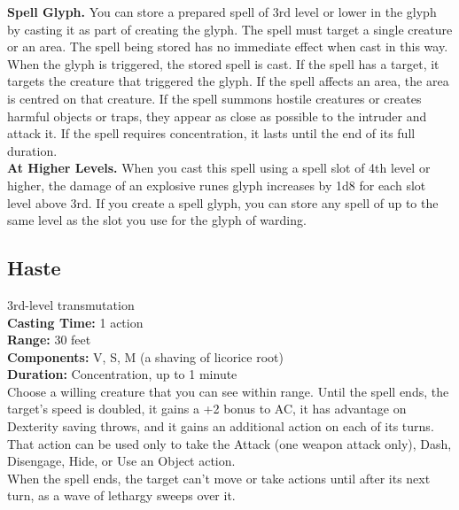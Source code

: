 \documentclass[11pt, A4paper, english]{article}
\begin{document}
\textbf{Spell Glyph.} You can store a prepared spell of 3rd level or lower in the glyph by casting it as part of creating the glyph. The spell must target a single creature or an area. The spell being stored has no immediate effect when cast in this way. When the glyph is triggered, the stored spell is cast. If the spell has a target, it targets the creature that triggered the glyph. If the spell affects an area, the area is centred on that creature. If the spell summons hostile creatures or creates harmful objects or traps, they appear as close as possible to the intruder and attack it. If the spell requires concentration, it lasts until the end of its full duration. \\
\textbf{At Higher Levels.} When you cast this spell using a spell slot of 4th level or higher, the damage of an explosive runes glyph increases by 1d8 for each slot level above 3rd. If you create a spell glyph, you can store any spell of up to the same level as the slot you use for the glyph of warding.

		\subsection{Haste}
3rd-level transmutation \\
\textbf{Casting Time:} 1 action \\
\textbf{Range:} 30 feet \\
\textbf{Components:} V, S, M (a shaving of licorice root) \\
\textbf{Duration:} Concentration, up to 1 minute \\
Choose a willing creature that you can see within range. Until the spell ends, the target's speed is doubled, it gains a +2 bonus to AC, it has advantage on Dexterity saving throws, and it gains an additional action on each of its turns. That action can be used only to take the Attack (one weapon attack only), Dash, Disengage, Hide, or Use an Object action. \\
When the spell ends, the target can’t move or take actions until after its next turn, as a wave of lethargy sweeps over it.
\end{document}
